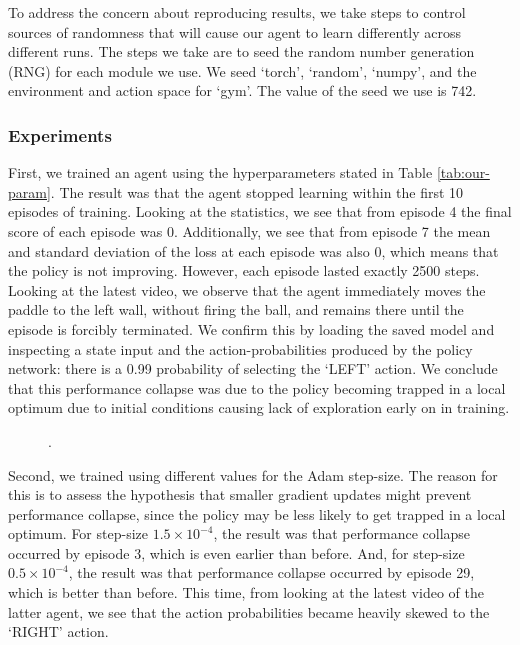 \documentclass[12pt,a4paper]{article}
\begin{document}
To address the concern about reproducing results, we take steps to control sources of randomness that will cause our agent to learn differently across different runs. The steps we take are to seed the random number generation (RNG) for each module we use. We seed `torch', `random', `numpy', and the environment and action space for `gym'. The value of the seed we use is 742.

\subsubsection{Experiments}
First, we trained an agent using the hyperparameters stated in Table \ref{tab:our-param}. The result was that the agent stopped learning within the first 10 episodes of training. Looking at the statistics, we see that from episode 4 the final score of each episode was 0. Additionally, we see that from episode 7 the mean and standard deviation of the loss at each episode was also 0, which means that the policy is not improving. However, each episode lasted exactly 2500 steps. Looking at the latest video, we observe that the agent immediately moves the paddle to the left wall, without firing the ball, and remains there until the episode is forcibly terminated. We confirm this by loading the saved model and inspecting a state input and the action-probabilities produced by the policy network: there is a 0.99 probability of selecting the `LEFT' action. We conclude that this performance collapse was due to the policy becoming trapped in a local optimum due to initial conditions causing lack of exploration early on in training. 

\begin{figure}[h]
    \centering
    \hfill
    \caption{.}
\end{figure}

Second, we trained using different values for the Adam step-size. The reason for this is to assess the hypothesis that smaller gradient updates might prevent performance collapse, since the policy may be less likely to get trapped in a local optimum. For step-size $1.5 \times 10^{-4}$, the result was that performance collapse occurred by episode 3, which is even earlier than before. And, for step-size $0.5 \times 10^{-4}$, the result was that performance collapse occurred by episode 29, which is better than before. This time, from looking at the latest video of the latter agent, we see that the action probabilities became heavily skewed to the `RIGHT' action. 
\end{document}
